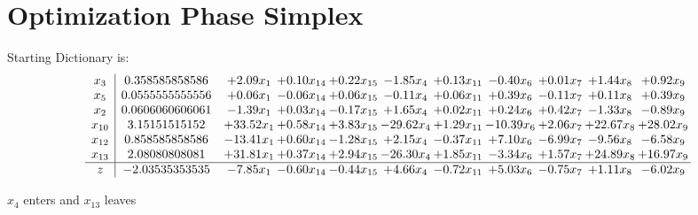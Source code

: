 \documentclass[9pt]{article}
\begin{document}
\section{Optimization Phase Simplex}
Starting Dictionary is:
\[\begin{array}{c| c c@{\hskip 2pt} c@{\hskip 2pt} c@{\hskip 2pt} c@{\hskip 2pt} c@{\hskip 2pt} c@{\hskip 2pt} c@{\hskip 2pt} c@{\hskip 2pt} c@{\hskip 2pt} }
 x_{3}   &  0.358585858586 & +  2.09 x_{1} & +  0.10 x_{14} & +  0.22 x_{15} & -1.85 x_{4} & +  0.13 x_{11} & -0.40 x_{6} & +  0.01 x_{7} & +  1.44 x_{8} & +  0.92 x_{9}\\
 x_{5}   &  0.0555555555556 & +  0.06 x_{1} & -0.06 x_{14} & +  0.06 x_{15} & -0.11 x_{4} & +  0.06 x_{11} & +  0.39 x_{6} & -0.11 x_{7} & +  0.11 x_{8} & +  0.39 x_{9}\\
 x_{2}   &  0.0606060606061 & -1.39 x_{1} & +  0.03 x_{14} & -0.17 x_{15} & +  1.65 x_{4} & +  0.02 x_{11} & +  0.24 x_{6} & +  0.42 x_{7} & -1.33 x_{8} & -0.89 x_{9}\\
 x_{10}   &  3.15151515152 & + 33.52 x_{1} & +  0.58 x_{14} & +  3.83 x_{15} & -29.62 x_{4} & +  1.29 x_{11} & -10.39 x_{6} & +  2.06 x_{7} & + 22.67 x_{8} & + 28.02 x_{9}\\
 x_{12}   &  0.858585858586 & -13.41 x_{1} & +  0.60 x_{14} & -1.28 x_{15} & +  2.15 x_{4} & -0.37 x_{11} & +  7.10 x_{6} & -6.99 x_{7} & -9.56 x_{8} & -6.58 x_{9}\\
 x_{13}   &  2.08080808081 & + 31.81 x_{1} & +  0.37 x_{14} & +  2.94 x_{15} & -26.30 x_{4} & +  1.85 x_{11} & -3.34 x_{6} & +  1.57 x_{7} & + 24.89 x_{8} & + 16.97 x_{9}\\
\hline
z    &  -2.03535353535 & -7.85 x_{1} & -0.60 x_{14} & -0.44 x_{15} & +  4.66 x_{4} & -0.72 x_{11} & +  5.03 x_{6} & -0.75 x_{7} & +  1.11 x_{8} & -6.02 x_{9}\\
\end{array}\]


 $ x_{4} $ enters and $ x_{13} $ leaves 
\end{document}
